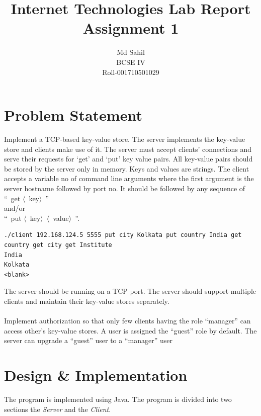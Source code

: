 \documentclass[titlepage]{article}
\title{Internet Technologies Lab Report\\Assignment 1}
\author{Md Sahil\\BCSE IV\\Roll-001710501029}
\date{}
\begin{document}
    {\maketitle}

    \section{Problem Statement}
    Implement a TCP-based key-value store. 
	The server implements the key-value store and clients 
	make use of it. The server must accept clients’ connections 
	and serve their requests for ‘get’ and ‘put’ key value pairs. 
	All key-value pairs should be stored by the server only 
	in memory. Keys and values are strings. 
	The client accepts a variable no of command line arguments 
	where the first argument is the server hostname followed 
	by port no. It should be followed by any sequence 
	of\\ 
    ``~get $\langle$~key$\rangle$~''\\ 
    and/or\\ 
    ``~put $\langle$~key$\rangle$~$\langle$~value$\rangle$~''. 

    \begin{verbatim}
./client 192.168.124.5 5555 put city Kolkata put country India get country get city get Institute
India
Kolkata 
<blank> 
    \end{verbatim}

	The server should be running on a TCP port. The server should support multiple 
    clients and maintain their key-value stores separately.\\~\\
    Implement authorization so that only few clients having the role “manager” can 
    access other’s key-value stores. A user is assigned the “guest” role by default. 
    The server can upgrade a “guest” user to a “manager” user 

    \section{Design \& Implementation}
    The program is implemented using Java.
    The program is divided into two sections the \emph{Server} and the \emph{Client}.
\end{document}
